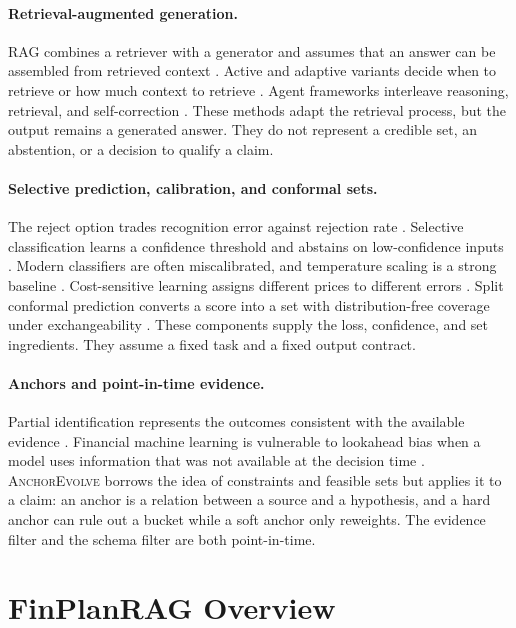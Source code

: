 \documentclass[11pt]{article}
\newcommand{\anchor}{\textsc{AnchorEvolve}}
\begin{document}
\paragraph{Retrieval-augmented generation.}
RAG combines a retriever with a generator and assumes that an answer can be assembled from retrieved context \citep{lewis2020rag}. Active and adaptive variants decide when to retrieve or how much context to retrieve \citep{jiang2023flare,jeong2024adaptiverag}. Agent frameworks interleave reasoning, retrieval, and self-correction \citep{yao2023react,shinn2023reflexion}. These methods adapt the retrieval process, but the output remains a generated answer. They do not represent a credible set, an abstention, or a decision to qualify a claim.

\paragraph{Selective prediction, calibration, and conformal sets.}
The reject option trades recognition error against rejection rate \citep{chow1970optimum}. Selective classification learns a confidence threshold and abstains on low-confidence inputs \citep{geifman2017selective}. Modern classifiers are often miscalibrated, and temperature scaling is a strong baseline \citep{guo2017calibration}. Cost-sensitive learning assigns different prices to different errors \citep{elkan2001cost}. Split conformal prediction converts a score into a set with distribution-free coverage under exchangeability \citep{vovk2005algorithmic,angelopoulos2021gentle}. These components supply the loss, confidence, and set ingredients. They assume a fixed task and a fixed output contract.

\paragraph{Anchors and point-in-time evidence.}
Partial identification represents the outcomes consistent with the available evidence \citep{manski2003partial}. Financial machine learning is vulnerable to lookahead bias when a model uses information that was not available at the decision time \citep{lopezdeprado2018advances}. \anchor{} borrows the idea of constraints and feasible sets but applies it to a claim: an anchor is a relation between a source and a hypothesis, and a hard anchor can rule out a bucket while a soft anchor only reweights. The evidence filter and the schema filter are both point-in-time.

\section{FinPlanRAG Overview}
\label{sec:architecture}
\end{document}
